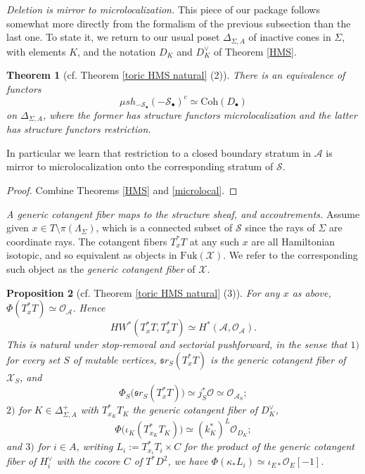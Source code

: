 \documentclass[11pt]{amsart}
\newtheorem{thm}{Theorem}[section]
\newtheorem{prop}[thm]{Proposition}
\theoremstyle{definition}
\theoremstyle{remark}
\newcommand{\A}{\mathcal{A}}
\newcommand{\X}{\mathcal{X}}
\newcommand{\Coh}{\mathrm{Coh}}
\newcommand{\Fuk}{\mathrm{Fuk}}
\numberwithin{equation}{section}
\begin{document}
\noindent \textit{Deletion is mirror to microlocalization.} This piece of our package follows somewhat more directly from the formalism of the previous subsection than the last one. To state it, we return to our usual poset $\Delta_{\Sigma, A}$ of inactive cones in $\Sigma$, with elements $K$, and the notation $D_K$ and $D_K^\vee$ of Theorem \ref{HMS}.

\begin{thm}[cf. Theorem \ref{toric HMS natural} (2)]\label{cluster HMS 2}
There is an equivalence of functors $$\mu sh_{-\mathcal{S}_\bullet}(-\mathcal{S}_\bullet)^c \simeq \Coh(D_\bullet)$$ on $\Delta_{\Sigma, A}$, where the former has structure functors microlocalization and the latter has structure functors restriction.
\end{thm}

In particular we learn that restriction to a closed boundary stratum in $\A$ is mirror to microlocalization onto the corresponding stratum of $\mathcal{S}$.

\begin{proof}
    Combine Theorems \ref{HMS} and \ref{microlocal}.
\end{proof}

\noindent \textit{A generic cotangent fiber maps to the structure sheaf, and accoutrements.} Assume given $x \in T \setminus \pi(\Lambda_\Sigma)$, which is a connected subset of $\mathcal{S}$ since the rays of $\Sigma$ are coordinate rays. The cotangent fibers $T^*_xT$ at any such $x$ are all Hamiltonian isotopic, and so equivalent as objects in $\Fuk(\X)$. We refer to the corresponding such object as the \textit{generic cotangent fiber} of $\X$.
 
\begin{prop}[cf. Theorem \ref{toric HMS natural} (3)]\label{cotangent generation}
For any $x$ as above,
$\Phi(T^*_xT) \simeq \mathcal O_\A$. Hence $$HW^*(T^*_xT,T^*_xT) \simeq H^*(\A, \mathcal{O}_\A).$$ This is natural under stop-removal and sectorial pushforward, in the sense that $1)$ for every set $S$ of mutable vertices, $\mathfrak sr_S(T^*_xT)$ is the generic cotangent fiber of $\X_S$, and
$$\Phi_S\bigl(\mathfrak sr_S(T^*_xT)\bigr)\simeq j_S^*\mathcal O\simeq\mathcal O_{\A_S};$$ $2)$ for $K\in\Delta^+_{\Sigma,A}$ with $T^*_{x_K}T_K$ the generic cotangent fiber of $D_K^\vee$,
$$\Phi\bigl(\iota_K(T^*_{x_K}T_K)\bigr)\simeq(k_K^*)^L\mathcal O_{D_K};$$ and $3)$ for $i\in A$, writing $L_i:=T^*_{x_i}T_i\times C$ for the product of the generic cotangent fiber of $H_i^\vee$ with the cocore $C$ of $T^*D^2$, we have $\Phi(\kappa_*L_i)\simeq\iota_{E*}\mathcal O_E[-1]$.
\end{prop}
 
\end{document}
